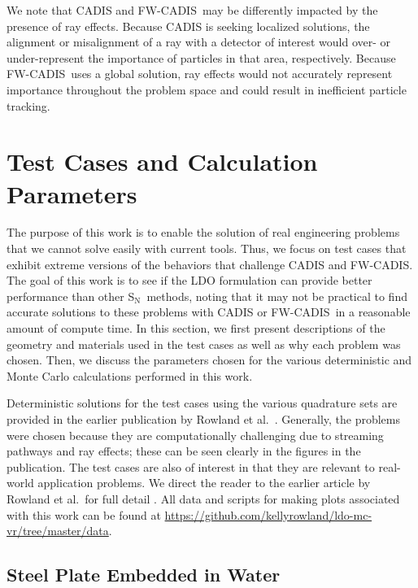\documentclass{article} %
\newcommand{\sn}{S$_\mathrm{N}$}
\newcommand{\fwc}{\mbox{FW-CADIS}}
\begin{document}
We note that CADIS and \fwc\ may be differently impacted by the presence of
ray effects. Because CADIS is seeking localized solutions, the alignment or
misalignment of a ray with a detector of interest would over- or under-represent
the importance of particles in that area, respectively. Because \fwc\ uses a
global solution, ray effects would not accurately represent importance
throughout the problem space and could result in inefficient particle tracking.

\section{Test Cases and Calculation Parameters}

The purpose of this work is to enable the solution of real engineering problems
that we cannot solve easily with current tools. Thus, we focus on test cases
that exhibit extreme versions of the behaviors that challenge CADIS and \fwc. The
goal of this work is to see if the LDO formulation can provide better
performance than other \sn\ methods, noting that it may not be practical to find
accurate solutions to these problems with CADIS or \fwc\ in a reasonable amount
of compute time. In this section, we first present descriptions of the geometry
and materials used in the test cases as well as why each problem was chosen.
Then, we discuss the parameters chosen for the various deterministic and Monte
Carlo calculations performed in this work.

Deterministic solutions for the test cases using the various quadrature sets
are provided in the earlier publication by Rowland et al.\ \cite{kr18}.
Generally, the problems were chosen because they are computationally
challenging due to streaming pathways and ray effects; these can be seen
clearly in the figures in the publication. The test cases are also
of interest in that they are relevant to real-world application problems. We
direct the reader to the earlier article by Rowland et al.\ for full detail
\cite{kr18}. All data and scripts for making plots associated with this work
can be found at \url{https://github.com/kellyrowland/ldo-mc-vr/tree/master/data}.

\subsection{Steel Plate Embedded in Water}
\label{sec:steel_params}
\end{document}
